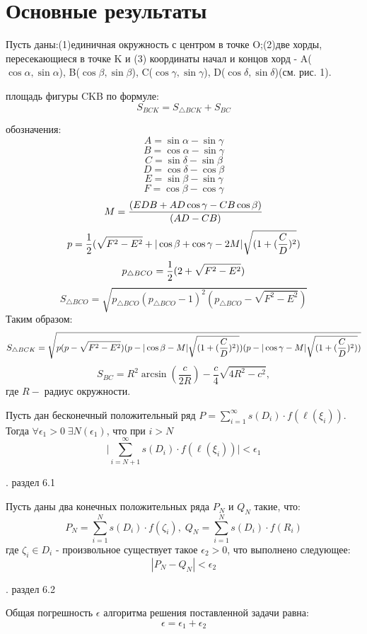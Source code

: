 \section{Основные результаты}
\begin{Lemma}
Пусть даны:(1)единичная окружность с центром в точке O;(2)две хорды, пересекающиеся в точке K и (3) координаты начал и концов хорд - A($\cos\alpha,\sin\alpha$), B($\cos\beta,\sin\beta$), C($\cos\gamma,\sin\gamma$), D($\cos\delta,\sin\delta$)(см. рис. 1).
\begin{figure}[h]
\end{figure}
 площадь фигуры CKB по формуле:
$$S_{BCK}=S_{\triangle BCK}+S_{BC}$$
\end{Lemma}
\proofname
{} обозначения:
$$A = \sin \alpha-\sin\gamma$$
$$B = \cos \alpha-\sin\gamma$$
$$C = \sin \delta-\sin\beta$$
$$D = \cos \delta-\cos\beta$$
$$E = \sin \beta-\sin\gamma$$
$$F = \cos \beta-\cos\gamma$$
$$M = {(EDB + AD\cos \gamma - CB\cos \beta) \over (AD - CB)}$$
$$p = {1\over 2}(\sqrt{F^2-E^2} + |\cos\beta+\cos\gamma-2M|\sqrt{(1+({C\over D})^2})$$
$$p_{\triangle BCO} = {1\over 2}(2+\sqrt{F^2-E^2})$$
$$S_{\triangle BCO} = \sqrt{p_{\triangle BCO}{(p_{\triangle BCO}-1)}^2(p_{\triangle BCO}-\sqrt{F^2-E^2})}$$
Таким образом:
$$S_{\triangle BCK} = \sqrt{p(p-\sqrt{F^2-E^2})(p-|\cos\beta-M|\sqrt{(1+({C\over D})^2)})(p-|\cos\gamma-M|\sqrt{(1+({C\over D})^2)})}$$
$$S_{BC} = R^2\arcsin{(\frac{c}{2R})}-\frac{c}{4}\sqrt{4R^2-c^2},$$ где $R-\;$радиус окружности.
\begin{Theorem}
Пусть дан бесконечный положительный ряд $P=\sum_{i=1}^\infty{s(D_i)\cdot f(\ell(\xi_i))}$. Тогда $\forall\epsilon_1>0\;\exists N(\epsilon_1)$, что при $i>N$
$$\Big\vert\sum_{i=N+1}^\infty{s(D_i)\cdot f(\ell(\xi_i))}\Big\vert<\epsilon_1$$
\end{Theorem}
\proofname
{}. раздел 6.1
\begin{Theorem}
Пусть даны два конечных положительных ряда $P_N$ и $Q_N$ такие, что:
$$P_N=\sum_{i=1}^N{s(D_i)\cdot f(\zeta_i)},\;Q_N=\sum_{i=1}^N{s(D_i)\cdot f(R_i)}$$
где $\zeta_i\in D_i$ - произвольное
 существует такое $\epsilon_2>0$, что выполнено следующее:
$$|P_N-Q_N|<\epsilon_2$$
\end{Theorem}
\proofname
{}. раздел 6.2
\begin{Corollary}
Общая погрешность $\epsilon$ алгоритма решения поставленной задачи равна:$$\epsilon=\epsilon_1+\epsilon_2$$
\end{Corollary}